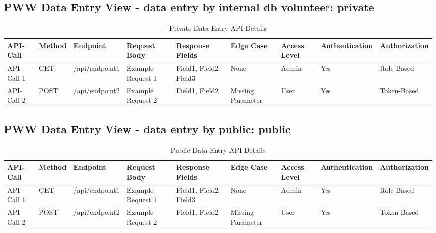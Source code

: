 \documentclass[manuscript]{acmart}
\begin{document}
\subsection{PWW Data Entry View - data entry by internal db volunteer: private}
\begin{table*}[h!]
  \scriptsize %
  \setlength{\tabcolsep}{4pt} %
  \caption{Private Data Entry API Details}
  \label{tab:api-details}
  \begin{tabular}{llm{}
                  m{}
                  m{}
                  m{}
                  m{}
                  m{}}
    \toprule
    API-Call & Method & Endpoint & Request Body & Response Fields & Edge Case & Access Level & Authentication & Authorization \\
    \midrule
    API-Call 1 & GET & /api/endpoint1 & Example Request 1 & Field1, Field2, Field3 & None & Admin & Yes & Role-Based \\
    API-Call 2 & POST & /api/endpoint2 & Example Request 2 & Field1, Field2 & Missing Parameter & User & Yes & Token-Based \\
    \bottomrule
  \end{tabular}
\end{table*}



\subsection{PWW Data Entry View - data entry by public: public}
\begin{table*}[h!]
  \scriptsize %
  \setlength{\tabcolsep}{4pt} %
  \caption{Public Data Entry API Details}
  \label{tab:api-details}
  \begin{tabular}{llm{}
                  m{}
                  m{}
                  m{}
                  m{}
                  m{}}
    \toprule
    API-Call & Method & Endpoint & Request Body & Response Fields & Edge Case & Access Level & Authentication & Authorization \\
    \midrule
    API-Call 1 & GET & /api/endpoint1 & Example Request 1 & Field1, Field2, Field3 & None & Admin & Yes & Role-Based \\
    API-Call 2 & POST & /api/endpoint2 & Example Request 2 & Field1, Field2 & Missing Parameter & User & Yes & Token-Based \\
    \bottomrule
  \end{tabular}
\end{table*}
\end{document}
